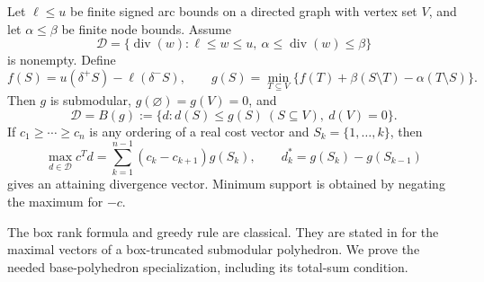 \begin{lemma}\label{s5:box-base}
Let $\ell\le u$ be finite signed arc bounds on a directed graph with
vertex set $V$, and let $\alpha\le\beta$ be finite node bounds.
Assume
\[
 \mathcal D=\{\operatorname{div}(w):\ell\le w\le u,
                  \ \alpha\le\operatorname{div}(w)\le\beta\}
\]
is nonempty. Define
\begin{equation}
 f(S)=u(\delta^+S)-\ell(\delta^-S),\qquad
 g(S)=\min_{T\subseteq V}\{f(T)+\beta(S\setminus T)
                                     -\alpha(T\setminus S)\}.
 \label{s5:box-rank}
\end{equation}
Then $g$ is submodular, $g(\varnothing)=g(V)=0$, and
\[
 \mathcal D=B(g):=\{d:d(S)\le g(S)\ (S\subseteq V),\ d(V)=0\}.
\]
If $c_1\ge\cdots\ge c_n$ is any ordering of a real cost vector and
$S_k=\{1,\ldots,k\}$, then
\begin{equation}
 \max_{d\in\mathcal D}c^Td
   =\sum_{k=1}^{n-1}(c_k-c_{k+1})g(S_k),\qquad
 d_k^*=g(S_k)-g(S_{k-1})
 \label{s5:greedy-support}
\end{equation}
gives an attaining divergence vector. Minimum support is obtained by
negating the maximum for $-c$.
\end{lemma}

The box rank formula and greedy rule are classical. They are stated in
\citet[Theorems~1--2, equation~(11), p.~192]{s5:shioura2013} for the
maximal vectors of a box-truncated submodular polyhedron. We prove the
needed base-polyhedron specialization, including its total-sum condition.

